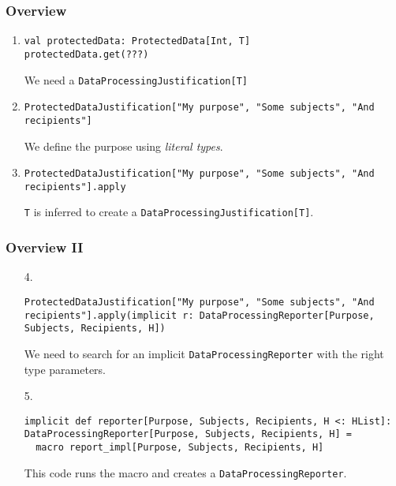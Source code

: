 \documentclass[aspectratio=169]{beamer}
\begin{document}
\begin{frame}[fragile]
\frametitle{Overview}

\begin{enumerate}
\item
\begin{lstlisting}[style=myScalastyle,frame=none]
val protectedData: ProtectedData[Int, T]
protectedData.get(???)
\end{lstlisting}
We need a \footnotesize{\texttt{DataProcessingJustification[T]}}
\pause
\item
\begin{lstlisting}[style=myScalastyle,frame=none]
ProtectedDataJustification["My purpose", "Some subjects", "And recipients"]
\end{lstlisting}
We define the purpose using \textit{literal types}.
\pause
\item
\begin{lstlisting}[style=myScalastyle,frame=none]
ProtectedDataJustification["My purpose", "Some subjects", "And recipients"].apply
\end{lstlisting}
\footnotesize{\texttt{T}} is inferred to create a \footnotesize{\texttt{DataProcessingJustification[T]}}.
\end{enumerate}

\end{frame}

\begin{frame}[fragile]
\frametitle{Overview II}

\begin{enumerate}
\item[4.]
\begin{lstlisting}[style=myScalastyle,frame=none]
ProtectedDataJustification["My purpose", "Some subjects", "And recipients"].apply(implicit r: DataProcessingReporter[Purpose, Subjects, Recipients, H])
\end{lstlisting}
We need to search for an implicit \texttt{DataProcessingReporter} with the right type parameters.
\item[5.]

\begin{lstlisting}[style=myScalastyle,frame=none]
  implicit def reporter[Purpose, Subjects, Recipients, H <: HList]: DataProcessingReporter[Purpose, Subjects, Recipients, H] =
  macro report_impl[Purpose, Subjects, Recipients, H]
\end{lstlisting}
This code runs the macro and creates a \texttt{DataProcessingReporter}.
\end{enumerate}
\end{frame}
\end{document}
